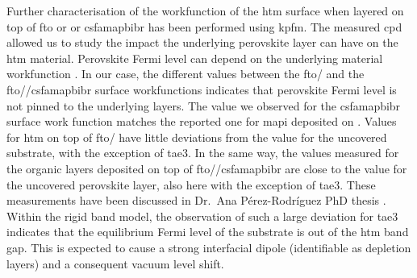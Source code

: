 	Further characterisation of the workfunction of the \gls{htm} surface when layered on top of \gls{fto} or  or \gls{csfamapbibr} has been performed using \gls{kpfm}.
	The measured \gls{cpd} allowed us to study the impact the underlying perovskite layer can have on the \gls{htm} material.
	Perovskite Fermi level can depend on the underlying material workfunction \cite{Miller2014,Olthof2017}.
	In our case, the different values between the \gls{fto}\-/ and the \gls{fto}\-/\-/\gls{csfamapbibr} surface workfunctions indicates that perovskite Fermi level is not pinned to the underlying layers.
	The value we observed for the \gls{csfamapbibr} surface work function matches the reported one for \gls{mapi} deposited on  \cite{Miller2014}.
	Values for \gls{htm} on top of \gls{fto}\-/ have little deviations from the value for the uncovered substrate, with the exception of \gls{tae3}.
	In the same way, the values measured for the organic layers deposited on top of \gls{fto}\-/\-/\gls{csfamapbibr} are close to the value for the uncovered perovskite layer, also here with the exception of \gls{tae3}.
	These measurements have been discussed in Dr.\ Ana Pérez\hyp{}Rodríguez PhD thesis \cite{Perez-Rodriguez2018}.
	Within the rigid band model, the observation of such a large deviation for \gls{tae3} indicates that the equilibrium Fermi level of the substrate is out of the \gls{htm} band gap.
	This is expected to cause a strong interfacial dipole (identifiable as depletion layers) and a consequent vacuum level shift.

	
